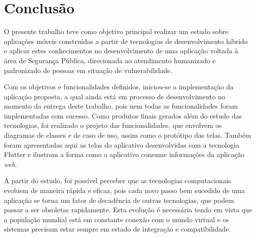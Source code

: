 \chapter{Conclusão}\label{cap:conclusao}

O presente trabalho teve como objetivo principal realizar um estudo sobre aplicações móveis construídas a partir de tecnologias de desenvolvimento híbrido e aplicar estes conhecimentos no desenvolvimento de uma aplicação voltada à área de Segurança Pública, direcionada ao atendimento humanizado e padronizado de pessoas em situação de vulnerabilidade.

Com os objetivos e funcionalidades definidos, iniciou-se a implementação da aplicação proposta, a qual ainda está em processo de desenvolvimento no momento da entrega deste trabalho, pois nem todas as funcionalidades foram implementadas com sucesso. Como produtos finais gerados além do estudo das tecnologias, foi realizado o projeto das funcionalidades, que envolvem os diagramas de classes e de caso de uso, assim como o protótipo das telas. Também foram apresentadas aqui as telas do aplicativo desenvolvidas com a tecnologia Flutter e ilustram a forma como o aplicativo consume informações da aplicação \textit{web}.  

A partir do estudo, foi possível perceber que as tecnologias computacionais evoluem de maneira rápida e eficaz, pois cada novo passo bem sucedido de uma aplicação se torna um fator de decadência de outras tecnologias, que podem passar a ser obsoletas rapidamente. Esta evolução é necessária tendo em vista que a população mundial está em constante conexão com o mundo virtual e os sistemas precisam estar sempre em estado de integração e compatibilidade.